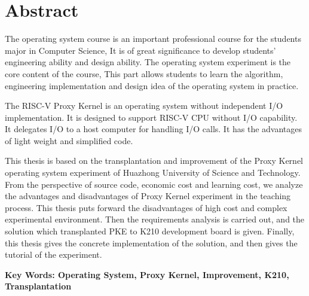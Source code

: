 \vspace*{-2mm}

\begin{spacing}{0.95}
  \centering
  \heiti{}\textbf{\thesisTitleEN}
\end{spacing}

\vspace*{17mm}

{\let\clearpage\relax \chapter*{
  \textmd{Abstract}\vskip -3bp}}
\setcounter{page}{2}

\setlength{\parskip}{0em}

The operating system course is an important professional course for the students major in Computer Science,
It is of great significance to develop students' engineering ability and design ability.
The operating system experiment is the core content of the course,
This part allows students to learn the algorithm, 
engineering implementation and design idea of the operating system in practice.

The RISC-V Proxy Kernel is an operating system without independent I/O implementation.
It is designed to support RISC-V CPU without I/O capability.
It delegates I/O to a host computer for handling I/O calls.
It has the advantages of light weight and simplified code.

This thesis is based on the transplantation and improvement of the Proxy Kernel operating system experiment of Huazhong University of Science and Technology.
From the perspective of source code, economic cost and learning cost,
we analyze the advantages and disadvantages of Proxy Kernel experiment in the teaching process.
This thesis puts forward the disadvantages of high cost and complex experimental environment.
Then the requirements analysis is carried out, and the solution which transplanted PKE to K210 development board is given.
Finally, this thesis gives the concrete implementation of the solution,
and then gives the tutorial of the experiment.

\vspace{3ex}\noindent\textbf{Key Words: Operating System, Proxy Kernel, Improvement, K210, Transplantation}
\newpage
